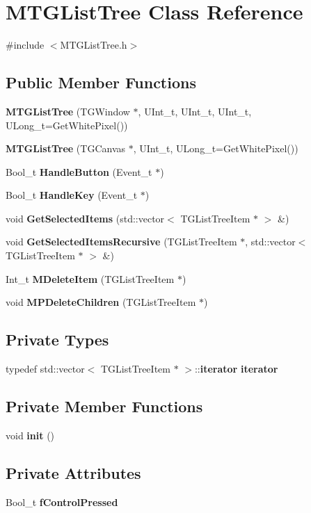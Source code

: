\section{MTGListTree Class Reference}
\label{classMTGListTree}


{\ttfamily \#include $<$MTGListTree.h$>$}

\subsection*{Public Member Functions}
\begin{DoxyCompactItemize}
\item 
{\bf MTGListTree} (TGWindow $\ast$, UInt\_\-t, UInt\_\-t, UInt\_\-t, ULong\_\-t=GetWhitePixel())
\item 
{\bf MTGListTree} (TGCanvas $\ast$, UInt\_\-t, ULong\_\-t=GetWhitePixel())
\item 
Bool\_\-t {\bf HandleButton} (Event\_\-t $\ast$)
\item 
Bool\_\-t {\bf HandleKey} (Event\_\-t $\ast$)
\item 
void {\bf GetSelectedItems} (std::vector$<$ TGListTreeItem $\ast$ $>$ \&)
\item 
void {\bf GetSelectedItemsRecursive} (TGListTreeItem $\ast$, std::vector$<$ TGListTreeItem $\ast$ $>$ \&)
\item 
Int\_\-t {\bf MDeleteItem} (TGListTreeItem $\ast$)
\item 
void {\bf MPDeleteChildren} (TGListTreeItem $\ast$)
\end{DoxyCompactItemize}
\subsection*{Private Types}
\begin{DoxyCompactItemize}
\item 
typedef std::vector$<$ TGListTreeItem $\ast$ $>$::{\bf iterator} {\bf iterator}
\end{DoxyCompactItemize}
\subsection*{Private Member Functions}
\begin{DoxyCompactItemize}
\item 
void {\bf init} ()
\end{DoxyCompactItemize}
\subsection*{Private Attributes}
\begin{DoxyCompactItemize}
\item 
Bool\_\-t {\bf fControlPressed}
\end{DoxyCompactItemize}
